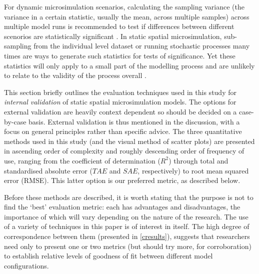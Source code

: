 \documentclass[a4paper,10pt]{article}
\begin{document}
For dynamic microsimulation scenarios,
calculating the sampling variance (the variance
in a certain statistic, usually the mean, across multiple samples)
across multiple model runs
is recommended to test if differences between different
scenorios are statistically significant \citep{goedeme2013testing}.
In static spatial
microsimulation, sub-sampling
from the individual level dataset or running stochastic processes
many times are ways to generate such statistics for tests
of significance. Yet these statistics will only apply to a small part
of the modelling process and are unlikely to relate to
the validity of the process overall \citep{Lovelace2013-trs}.

This section briefly outlines the evaluation techniques
used in this study for \emph{internal validation}
of static spatial microsimulation models.
The options for external
validation are heavily context dependent so should be decided on a
case-by-case basis.
External validation is thus mentioned in the discussion,
with a focus on general principles
rather than specific advice. The three quantitative
methods used in this study (and the visual method of scatter plots)
are presented in ascending order of complexity
and roughly descending order of frequency of use, ranging from 
the coefficient of determination ($R^2$) through total and standardised
absolute error ($TAE$ and $SAE$, respectively)
to root mean squared error (RMSE).
This latter option is our preferred metric, as described below.

Before these methods are described, it is
worth stating that the purpose is not to find the `best' evaluation metric:
each has advantages and disadvantages, the importance of which will vary depending on the
nature of the research. The use of a variety of techniques in this paper
is of interest in itself. The high degree of correspondence between them (presented in \cref{cresults}),
suggests that researchers need only to present one or two metrics (but should
try more, for corroboration)
to establish relative levels of goodness of fit between
different model configurations.
\end{document}
